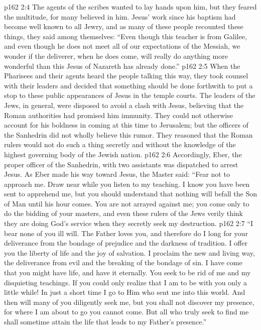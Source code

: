 \vs p162 2:4 The agents of the scribes wanted to lay hands upon him, but they feared the multitude, for many believed in him. Jesus’ work since his baptism had become well known to all Jewry, and as many of these people recounted these things, they said among themselves: “Even though this teacher is from Galilee, and even though he does not meet all of our expectations of the Messiah, we wonder if the deliverer, when he does come, will really do anything more wonderful than this Jesus of Nazareth has already done.”
\vs p162 2:5 When the Pharisees and their agents heard the people talking this way, they took counsel with their leaders and decided that something should be done forthwith to put a stop to these public appearances of Jesus in the temple courts. The leaders of the Jews, in general, were disposed to avoid a clash with Jesus, believing that the Roman authorities had promised him immunity. They could not otherwise account for his boldness in coming at this time to Jerusalem; but the officers of the Sanhedrin did not wholly believe this rumor. They reasoned that the Roman rulers would not do such a thing secretly and without the knowledge of the highest governing body of the Jewish nation.
\vs p162 2:6 Accordingly, Eber, the proper officer of the Sanhedrin, with two assistants was dispatched to arrest Jesus. As Eber made his way toward Jesus, the Master said: \textcolor{ubdarkred}{“Fear not to approach me. Draw near while you listen to my teaching. I know you have been sent to apprehend me, but you should understand that nothing will befall the Son of Man until his hour comes. You are not arrayed against me; you come only to do the bidding of your masters, and even these rulers of the Jews verily think they are doing God’s service when they secretly seek my destruction.}
\vs p162 2:7 \textcolor{ubdarkred}{“I bear none of you ill will. The Father loves you, and therefore do I long for your deliverance from the bondage of prejudice and the darkness of tradition. I offer you the liberty of life and the joy of salvation. I proclaim the new and living way, the deliverance from evil and the breaking of the bondage of sin. I have come that you might have life, and have it eternally. You seek to be rid of me and my disquieting teachings. If you could only realize that I am to be with you only a little while! In just a short time I go to Him who sent me into this world. And then will many of you diligently seek me, but you shall not discover my presence, for where I am about to go you cannot come. But all who truly seek to find me shall sometime attain the life that leads to my Father’s presence.”}
